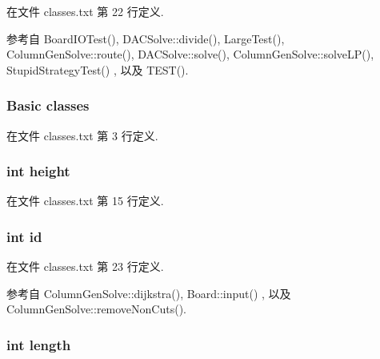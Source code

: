 在文件 classes.\+txt 第 22 行定义.



参考自 Board\+I\+O\+Test(), D\+A\+C\+Solve\+::divide(), Large\+Test(), Column\+Gen\+Solve\+::route(), D\+A\+C\+Solve\+::solve(), Column\+Gen\+Solve\+::solve\+L\+P(), Stupid\+Strategy\+Test() , 以及 T\+E\+S\+T().

\subsubsection[{\texorpdfstring{classes}{classes}}]{ Basic classes}\hypertarget{classes_8txt_ad6cc41fabb67cb459387b9c9375f4aff}{}\label{classes_8txt_ad6cc41fabb67cb459387b9c9375f4aff}


在文件 classes.\+txt 第 3 行定义.

\subsubsection[{\texorpdfstring{height}{height}}]{\setlength{\rightskip}{0pt plus 5cm}int height}\hypertarget{classes_8txt_ad12fc34ce789bce6c8a05d8a17138534}{}\label{classes_8txt_ad12fc34ce789bce6c8a05d8a17138534}


在文件 classes.\+txt 第 15 行定义.

\subsubsection[{\texorpdfstring{id}{id}}]{\setlength{\rightskip}{0pt plus 5cm}int id}\hypertarget{classes_8txt_a7441ef0865bcb3db9b8064dd7375c1ea}{}\label{classes_8txt_a7441ef0865bcb3db9b8064dd7375c1ea}


在文件 classes.\+txt 第 23 行定义.



参考自 Column\+Gen\+Solve\+::dijkstra(), Board\+::input() , 以及 Column\+Gen\+Solve\+::remove\+Non\+Cuts().

\subsubsection[{\texorpdfstring{length}{length}}]{\setlength{\rightskip}{0pt plus 5cm}int length}\hypertarget{classes_8txt_a9f59b34b1f25fe00023291b678246bcc}{}\label{classes_8txt_a9f59b34b1f25fe00023291b678246bcc}


